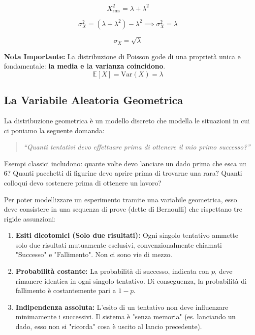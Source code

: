 \begin{equation}
\boxed{X^2_{\text{rms}} = \lambda + \lambda^2}
\end{equation}

\begin{equation}
\sigma_X^2 = (\lambda + \lambda^2) - \lambda^2 \implies \boxed{\sigma_X^2 = \lambda}
\end{equation}

\begin{equation}
\boxed{\sigma_X = \sqrt{\lambda}}
\end{equation}

\textbf{Nota Importante:} La distribuzione di Poisson gode di una proprietà unica e fondamentale: \textbf{la media e la varianza coincidono}.
\[ \mathbb{E}[X] = \text{Var}(X) = \lambda \] 

\subsection{La Variabile Aleatoria Geometrica}

La distribuzione geometrica è un modello discreto che modella le situazioni in cui ci poniamo la seguente domanda:
\begin{quote}
    \textit{``Quanti tentativi devo effettuare prima di ottenere il mio primo successo?''}
\end{quote}

Esempi classici includono: quante volte devo lanciare un dado prima che esca un 6? Quanti pacchetti di figurine devo aprire prima di trovarne una rara? Quanti colloqui devo sostenere prima di ottenere un lavoro?

Per poter modellizzare un esperimento tramite una variabile geometrica, esso deve consistere in una sequenza di prove (dette di Bernoulli) che rispettano tre rigide assunzioni:
\begin{enumerate}
    \item \textbf{Esiti dicotomici (Solo due risultati):} Ogni singolo tentativo ammette solo due risultati mutuamente esclusivi, convenzionalmente chiamati "Successo" e "Fallimento". Non ci sono vie di mezzo.
    \item \textbf{Probabilità costante:} La probabilità di successo, indicata con $p$, deve rimanere identica in ogni singolo tentativo. Di conseguenza, la probabilità di fallimento è costantemente pari a $1-p$.
    \item \textbf{Indipendenza assoluta:} L'esito di un tentativo non deve influenzare minimamente i successivi. Il sistema è "senza memoria" (es. lanciando un dado, esso non si "ricorda" cosa è uscito al lancio precedente).
\end{enumerate}

